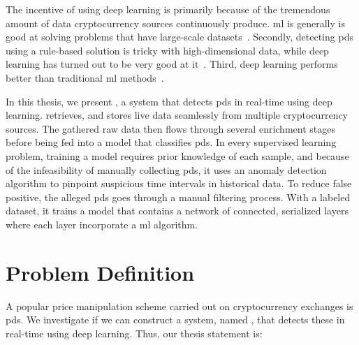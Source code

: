 The incentive of using deep learning is primarily because of the tremendous amount of data cryptocurrency sources continuously produce. \ac{ml} is generally is good at solving problems that have large-scale datasets~\cite{aws}. Secondly, detecting \acp{pd} using a rule-based solution is tricky with high-dimensional data, while deep learning has turned out to be very good at it~\cite{lecun2015deep}. Third, deep learning performs better than traditional \ac{ml} methods~\cite{dl_intrusion, peng2015multi}. 

In this thesis, we present \project, a system that detects \acp{pd} in real-time using deep learning. \project retrieves, and stores live data seamlessly from multiple cryptocurrency sources. The gathered raw data then flows through several enrichment stages before being fed into a model that classifies \acp{pd}. In every supervised learning problem, training a model requires prior knowledge of each sample, and because of the infeasibility of manually collecting \acp{pd}, it uses an anomaly detection algorithm to pinpoint suspicious time intervals in historical data. To reduce false positive, the alleged \acp{pd} goes through a manual filtering process. With a labeled dataset, it trains a model that contains a network of connected, serialized layers where each layer incorporate a \ac{ml} algorithm.



\section{Problem Definition}\label{sec:problem_definition}
A popular price manipulation scheme carried out on cryptocurrency exchanges is \acp{pd}. We investigate if we can construct a system, named \project, that detects these in real-time using deep learning. Thus, our thesis statement is:

